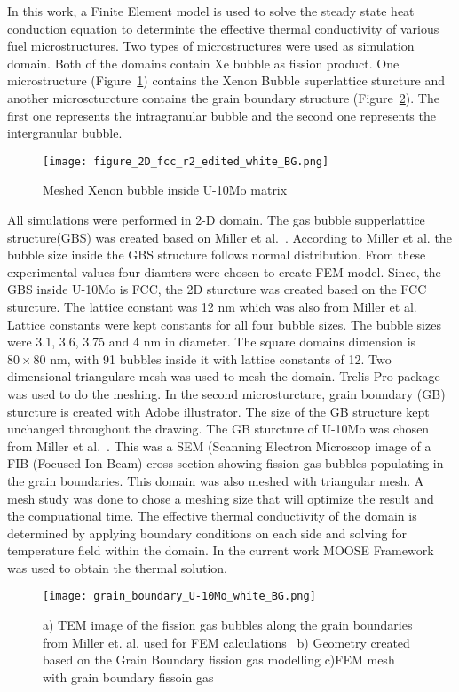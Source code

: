 \begin{doublespacing}
In this work, a Finite Element model is used to solve the steady state heat conduction equation to determinte the effective thermal conductivity of various fuel microstructures. Two types of microstructures were used as simulation domain. Both of the domains contain Xe bubble as fission product. One microstructure (Figure~\ref{fcc_mesh}) contains the Xenon Bubble superlattice sturcture and another microscturcture contains the grain boundary structure (Figure~\ref{fig_Xe_K}). The first one represents the intragranular bubble and the second one represents the intergranular bubble.
\begin{figure}
\centering
\texttt{[image: figure\_2D\_fcc\_r2\_edited\_white\_BG.png]}
\caption{Meshed Xenon bubble inside U-10Mo matrix}
\label{fcc_mesh}
\end{figure}
All simulations were performed in 2-D domain. The gas bubble supperlattice structure(GBS) was created based on Miller et al.~\cite{miller2015transmission}. According to Miller et al. the bubble size inside the GBS structure follows normal distribution. From these experimental values four diamters were chosen to create FEM model. Since, the GBS inside U-10Mo is FCC, the 2D sturcture was created based on the FCC sturcture. The lattice constant was 12 nm which was also from Miller et al. Lattice constants were kept constants for all four bubble sizes. The bubble sizes were 3.1, 3.6, 3.75 and 4 nm in diameter. The square domains dimension is $80\times80$ nm, with 91 bubbles inside it with lattice constants of 12. Two dimensional triangulare mesh was used to mesh the domain. Trelis Pro package was used to do the meshing. In the second microsturcture, grain boundary (GB) sturcture is created with Adobe illustrator. The size of the GB structure kept unchanged throughout the drawing. The GB sturcture of U-10Mo was chosen from Miller et al.~\cite{miller2012advantages}. This was a SEM (Scanning Electron Microscop image of a FIB (Focused Ion Beam) cross-section showing fission gas bubbles populating in the grain boundaries. This domain was also meshed with triangular mesh. A mesh study was done to chose a meshing size that will optimize the result and the compuational time. The effective thermal conductivity of the domain is determined by applying boundary conditions on each side  and solving for temperature field within the domain. In the current work MOOSE Framework~\cite{gaston2009moose} was used to obtain the thermal solution.

\begin{figure}[H]
\centering
\texttt{[image: grain\_boundary\_U-10Mo\_white\_BG.png]}
\caption{a) TEM image of the fission gas bubbles along the grain boundaries from Miller et. al. used for FEM calculations~\cite{miller2012advantages} b) Geometry created based on the Grain Boundary fission gas modelling c)FEM mesh with grain boundary fissoin gas }
\label{fig_Xe_K}
\end{figure}




\end{doublespacing}
